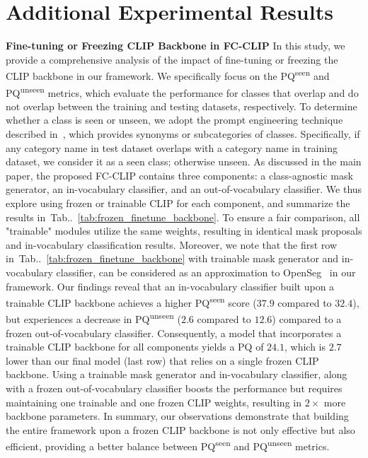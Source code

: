 \documentclass{article}
\makeatletter
\DeclareRobustCommand\onedot{\futurelet\@let@token\@onedot}
\def\@onedot{\ifx\@let@token.\else.\null\fi\xspace}
\newcommand{\tabref}[1]{Tab\onedot~\ref{#1}}
\newcommand{\modelname}{FC-CLIP\xspace}
\makeatother
\begin{document}
\section{Additional Experimental Results}
\noindent \textbf{Fine-tuning or Freezing CLIP Backbone in \modelname}\quad
In this study, we provide a comprehensive analysis of the impact of fine-tuning or freezing the CLIP backbone in our framework. We specifically focus on the PQ\textsuperscript{seen} and PQ\textsuperscript{unseen} metrics, which evaluate the performance for classes that overlap and do not overlap between the training and testing datasets, respectively.
To determine whether a class is seen or unseen, we adopt the prompt engineering technique described in~\cite{ghiasi2022scaling}, which provides synonyms or
subcategories of classes. Specifically, if any category name in test dataset overlaps with a category name in training dataset, we consider it as a seen class; otherwise unseen.
As discussed in the main paper, the proposed \modelname contains three components: a class-agnostic mask generator, an in-vocabulary classifier, and an out-of-vocabulary classifier.
We thus explore using frozen or trainable CLIP for each component, and summarize the results in~\tabref{tab:frozen_finetune_backbone}.
To ensure a fair comparison, all "trainable" modules utilize the same weights, resulting in identical mask proposals and in-vocabulary classification results.
Moreover, we note that the first row in~\tabref{tab:frozen_finetune_backbone} with trainable mask generator and in-vocabulary classifier, can be considered as an approximation to OpenSeg~\cite{ghiasi2022scaling} in our framework.
Our findings reveal that an in-vocabulary classifier built upon a trainable CLIP backbone achieves a higher PQ\textsuperscript{seen} score ($37.9$ compared to $32.4$), but experiences a decrease in PQ\textsuperscript{unseen} ($2.6$ compared to $12.6$) compared to a frozen out-of-vocabulary classifier.
Consequently, a model that incorporates a trainable CLIP backbone for all components yields a PQ of $24.1$, which is $2.7$ lower than our final model (last row) that relies on a single frozen CLIP backbone.
Using a trainable mask generator and in-vocabulary classifier, along with a frozen out-of-vocabulary classifier boosts the performance but requires maintaining one trainable and one frozen CLIP weights, resulting in $2\times$ more backbone parameters.
In summary, our observations demonstrate that building the entire framework upon a frozen CLIP backbone is not only effective but also efficient, providing a better balance between PQ\textsuperscript{seen} and PQ\textsuperscript{unseen} metrics.
\end{document}
